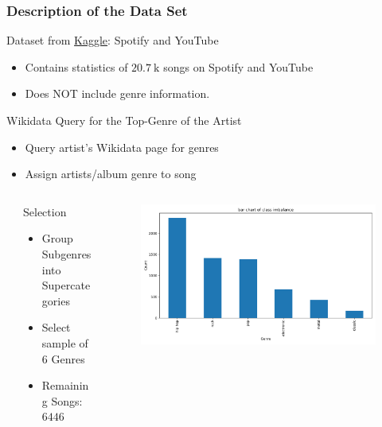 \documentclass[8pt]{beamer}
\begin{document}
\logo{}

\begin{frame}
  \frametitle{Description of the Data Set}
    \begin{alertblock}{Dataset from \href{https://www.kaggle.com/datasets/salvatorerastelli/spotify-and-youtube}{Kaggle}: Spotify and YouTube}
      \begin{itemize}
        \item Contains statistics of $\SI{20.7}{\kilo}$ songs on Spotify and YouTube
        \item Does \alert{NOT} include genre information.
      \end{itemize}
    \end{alertblock}
    \begin{alertblock}{Wikidata Query for the Top-Genre of the Artist}
      \begin{itemize}
       \item Query artist’s Wikidata page for genres
       \item Assign artists/album genre to song
      \end{itemize}
    \end{alertblock}
    \vspace*{-0.5cm}
    \begin{columns}[t]
        \begin{column}{0.0\textwidth}
        \end{column}
        \begin{column}{0.3\textwidth}
            \begin{alertblock}{Selection}
                \begin{itemize}
                    \item Group Subgenres into Supercategories
                    \item Select sample of $\num{6}$ Genres
                    \item Remaining Songs: $\num{6446}$
                \end{itemize}
            \end{alertblock}
        \end{column}
        \begin{column}{0.7\textwidth}
            \begin{figure}
                \includegraphics[width=\textwidth]{figures/genre_hist.pdf}

\end{figure}
\end{column}
\end{columns}
\end{frame}
\end{document}
